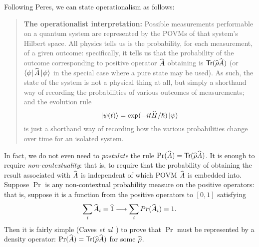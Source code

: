 \documentclass[12pt]{article}
\newcommand{\be}{\begin{equation}}
\newcommand{\ee}{\end{equation}}
\newcommand{\ket}[1]{\ensuremath{\left|  #1 \right\rangle}}
\newcommand{\bra}[1]{\ensuremath{\left\langle #1 \right|}}
\newcommand{\matel}[3]{\ensuremath{\bra{#1} #2 \ket{#3}}}
\newcommand{\op}[1]{\ensuremath{\widehat{\textsf{\ensuremath{#1}}}}}
\newcommand{\id}{\op{\mathsf{1}}}
\newcommand{\tr}{\textsf{Tr}}
\newcommand{\denop}{\op{\rho}}
\begin{document}
Following Peres, we can state operationalism as follows:
\begin{quote}
\textbf{The operationalist interpretation:}
Possible measurements performable on a quantum system are represented by the POVMs of that system's Hilbert space. 
All physics tells us is the probability, for each measurement, of a given outcome: specifically, it tells us that the probability of the outcome corresponding
to positive operator \op{A} obtaining is $\tr(\denop \op{A})$ (or $\matel{\psi}{\op{A}}{\psi}$ in the special case where a pure state may be used). As such, the state of the system is not a physical thing at all, but simply a shorthand way of recording the probabilities of various outcomes of measurements; and the evolution rule
\be \ket{\psi(t)}=\exp(-it \op{H}/\hbar)\ket{\psi}\ee
is just a shorthand way of recording how the various probabilities change over time for an isolated system.
\end{quote}
In fact, we do not even need to \emph{postulate} the rule $\Pr(\op{A})=\tr(\denop \op{A})$. It is enough to require \emph{non-contextuality}: that is, to require that the probability of obtaining the result associated with \op{A} is independent of which POVM \op{A} is embedded into. Suppose $\Pr$ is any non-contextual probability measure on the positive operators: that is, suppose it is a function from the positive operators to $[0,1]$ satisfying
\be
\sum_i\op{A}_i=\id \longrightarrow \sum_i\\Pr(\op{A}_i)=1.
\ee
Then it is fairly simple (Caves \emph{et al}~) to prove that $\Pr$ must be represented by a density operator: $\Pr(\op{A})=\tr(\denop \op{A})$ for some \denop. 
\end{document}
